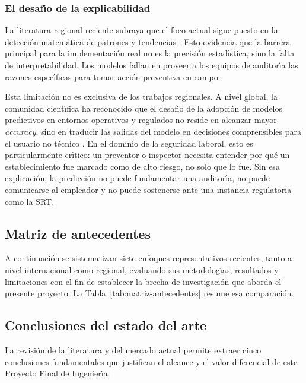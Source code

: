 \subsubsection{El desaf\'{\i}o de la explicabilidad}

La literatura regional reciente subraya que el foco actual sigue puesto en la detecci\'on matem\'atica de patrones y tendencias \parencite{zamora2024}. Esto evidencia que la barrera principal para la implementaci\'on real no es la precisi\'on estad\'{\i}stica, sino la falta de interpretabilidad. Los modelos fallan en proveer a los equipos de auditor\'{\i}a las razones espec\'{\i}ficas para tomar acci\'on preventiva en campo.

Esta limitaci\'on no es exclusiva de los trabajos regionales. A nivel global, la comunidad cient\'{\i}fica ha reconocido que el desaf\'{\i}o de la adopci\'on de modelos predictivos en entornos operativos y regulados no reside en alcanzar mayor \emph{accuracy}, sino en traducir las salidas del modelo en decisiones comprensibles para el usuario no t\'ecnico \parencite{arrieta2020}. En el dominio de la seguridad laboral, esto es particularmente cr\'{\i}tico: un preventor o inspector necesita entender por qu\'e un establecimiento fue marcado como de alto riesgo, no solo que lo fue. Sin esa explicaci\'on, la predicci\'on no puede fundamentar una auditor\'{\i}a, no puede comunicarse al empleador y no puede sostenerse ante una instancia regulatoria como la SRT.

\subsection{Matriz de antecedentes}

A continuaci\'on se sistematizan siete enfoques representativos recientes, tanto a nivel internacional como regional, evaluando sus metodolog\'{\i}as, resultados y limitaciones con el fin de establecer la brecha de investigaci\'on que aborda el presente proyecto. La Tabla~\ref{tab:matriz-antecedentes} resume esa comparaci\'on.



\subsection{Conclusiones del estado del arte}

La revisi\'on de la literatura y del mercado actual permite extraer cinco conclusiones fundamentales que justifican el alcance y el valor diferencial de este Proyecto Final de Ingenier\'{\i}a:

